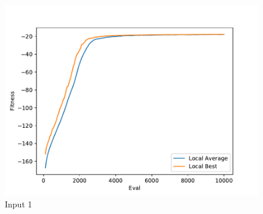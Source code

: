 \documentclass{standalone}
\begin{document}
\begin{figure}[!htb]
	\caption{Input 1}
	\label{fig:graph_1068}
	\includegraphics[width=\textwidth]{../graphs/graphs/1068.pdf}
\end{figure}
\end{document}
